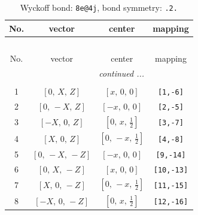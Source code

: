 \documentclass[fleqn,8pt]{jsarticle}
\begin{document}
\begin{longtable}{cccc}
\caption{Wyckoff bond: {\tt 8e@4j}, bond symmetry: {\tt .2.}}
 \\
 \hline \hline
No. & vector & center & mapping \\ \hline \endfirsthead

\multicolumn{3}{l}{\tablename\ \thetable{}} \\
 \hline \hline
No. & vector & center & mapping \\ \hline \endhead

 \hline \hline
\multicolumn{3}{r}{\footnotesize\it continued ...} \\ \endfoot

 \hline \hline
\multicolumn{3}{r}{} \\ \endlastfoot

1 & $\left[ 0,\, X,\, Z \right]$ & $\left[ x,\, 0,\, 0 \right]$ & {\tt [1,-6]} \\ \hline
2 & $\left[ 0,\, - X,\, Z \right]$ & $\left[ - x,\, 0,\, 0 \right]$ & {\tt [2,-5]} \\ \hline
3 & $\left[ - X,\, 0,\, Z \right]$ & $\left[ 0,\, x,\, \frac{1}{2} \right]$ & {\tt [3,-7]} \\ \hline
4 & $\left[ X,\, 0,\, Z \right]$ & $\left[ 0,\, - x,\, \frac{1}{2} \right]$ & {\tt [4,-8]} \\ \hline
5 & $\left[ 0,\, - X,\, - Z \right]$ & $\left[ - x,\, 0,\, 0 \right]$ & {\tt [9,-14]} \\ \hline
6 & $\left[ 0,\, X,\, - Z \right]$ & $\left[ x,\, 0,\, 0 \right]$ & {\tt [10,-13]} \\ \hline
7 & $\left[ X,\, 0,\, - Z \right]$ & $\left[ 0,\, - x,\, \frac{1}{2} \right]$ & {\tt [11,-15]} \\ \hline
8 & $\left[ - X,\, 0,\, - Z \right]$ & $\left[ 0,\, x,\, \frac{1}{2} \right]$ & {\tt [12,-16]} \\
\end{longtable}
\renewcommand{\arraystretch}{1.2}
\end{document}
